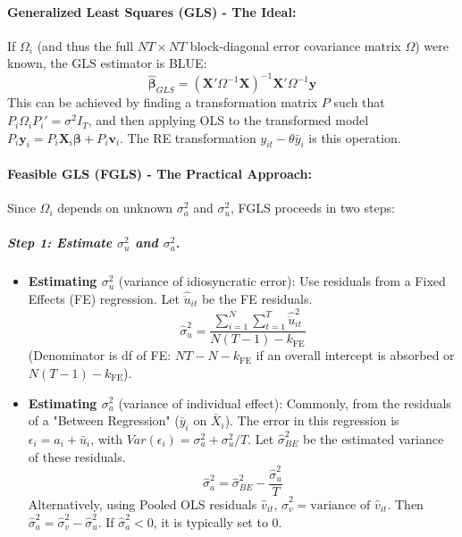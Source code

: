 \documentclass[a4paper, 10pt]{article}
\theoremstyle{definition}	%
\begin{document}
\paragraph{Generalized Least Squares (GLS) - The Ideal:}
If \(\Omega_i\) (and thus the full \(NT \times NT\) block-diagonal error covariance matrix \(\Omega\)) were known, the GLS estimator is BLUE:
\[ \hat{\boldsymbol{\beta}}_{GLS} = (\mathbf{X}' \Omega^{-1} \mathbf{X})^{-1} \mathbf{X}' \Omega^{-1} \mathbf{y} \]
This can be achieved by finding a transformation matrix \(P\) such that \(P_i \Omega_i P_i' = \sigma^2 I_T\), and then applying OLS to the transformed model \(P_i \mathbf{y}_i = P_i \mathbf{X}_i \boldsymbol{\beta} + P_i \mathbf{v}_i\). The RE transformation \(y_{it} - \theta \bar{y}_i\) is this operation.

\paragraph{Feasible GLS (FGLS) - The Practical Approach:}
Since \(\Omega_i\) depends on unknown \(\sigma_a^2\) and \(\sigma_u^2\), FGLS proceeds in two steps:

\subparagraph{Step 1: Estimate \(\sigma_u^2\) and \(\sigma_a^2\).}
\begin{itemize}
    \item \textbf{Estimating \(\sigma_u^2\)} (variance of idiosyncratic error):
    Use residuals from a Fixed Effects (FE) regression. Let \(\hat{\ddot{u}}_{it}\) be the FE residuals.
    \[ \hat{\sigma}_u^2 = \frac{\sum_{i=1}^{N}\sum_{t=1}^{T} \hat{\ddot{u}}_{it}^2}{N(T-1) - k_{\text{FE}}} \]
    (Denominator is df of FE: \(NT-N-k_{\text{FE}}\) if an overall intercept is absorbed or \(N(T-1)-k_{\text{FE}}\)).

    \item \textbf{Estimating \(\sigma_a^2\)} (variance of individual effect):
    Commonly, from the residuals of a "Between Regression" (\(\bar{y}_i\) on \(\bar{X}_i\)). The error in this regression is \(\epsilon_i = a_i + \bar{u}_i\), with \(Var(\epsilon_i) = \sigma_a^2 + \sigma_u^2/T\). Let \(\hat{\sigma}_{BE}^2\) be the estimated variance of these residuals.
    \[ \hat{\sigma}_a^2 = \hat{\sigma}_{BE}^2 - \frac{\hat{\sigma}_u^2}{T} \]
    Alternatively, using Pooled OLS residuals \(\hat{v}_{it}\), \(\hat{\sigma}_v^2 = \text{variance of } \hat{v}_{it}\). Then \(\hat{\sigma}_a^2 = \hat{\sigma}_v^2 - \hat{\sigma}_u^2\).
    If \(\hat{\sigma}_a^2 < 0\), it is typically set to 0.
\end{itemize}
\end{document}
